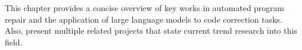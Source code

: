 This chapter provides a concise overview of key works in automated program repair and the application of large language models to code correction tasks. Also, present multiple related projects that state current trend research into this field.